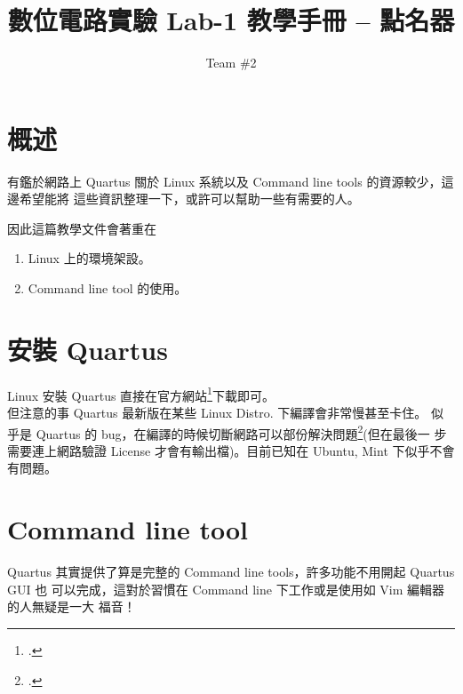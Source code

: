 \documentclass[12pt, a4paper]{article}
\title{數位電路實驗 Lab-1 教學手冊 -- 點名器}
\author{Team \#2}
\begin{document}
\maketitle

\section{概述}
有鑑於網路上 Quartus 關於 Linux 系統以及 Command line tools 的資源較少，這邊希望能將
這些資訊整理一下，或許可以幫助一些有需要的人。

因此這篇教學文件會著重在
\begin{enumerate}
  \item Linux 上的環境架設。
  \item Command line tool 的使用。
\end{enumerate}

\section{安裝 Quartus}
Linux 安裝 Quartus 直接在官方網站\footcite{QuartusDL}下載即可。 \\

但注意的事 Quartus 最新版在某些 Linux Distro. 下編譯會非常慢甚至卡住。
似乎是 Quartus 的 bug，在編譯的時候切斷網路可以部份解決問題\footcite{QuartusBugHack}(但在最後一
步需要連上網路驗證 License 才會有輸出檔)。目前已知在 Ubuntu, Mint 下似乎不會有問題。

\section{Command line tool}
Quartus 其實提供了算是完整的 Command line tools，許多功能不用開起 Quartus GUI 也
可以完成，這對於習慣在 Command line 下工作或是使用如 Vim 編輯器的人無疑是一大
福音！
\end{document}
